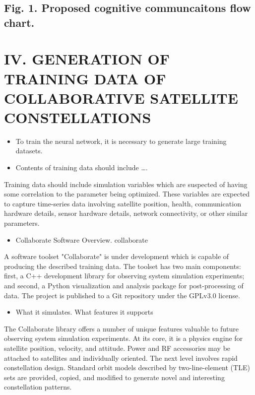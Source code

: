 \documentclass[11pt]{article}
\begin{document}
\subsection*{Fig. 1. Proposed cognitive communcaitons flow chart.}
\label{sec:orgf4b25f3}

\section*{IV. GENERATION OF TRAINING DATA OF COLLABORATIVE SATELLITE CONSTELLATIONS}
\label{sec:orge0317fa}

\begin{itemize}
\item To train the neural network, it is necessary to generate large training
datasets.

\item Contents of training data should include \ldots{}.
\end{itemize}

Training data should include simulation variables which are suspected of having
some correlation to the parameter being optimized.  These variables are expected
to capture time-series data involving satellite position, health, communication
hardware details, sensor hardware details, network connectivity, or other
similar parameters.

\begin{itemize}
\item Collaborate Software Overview.  collaborate
\end{itemize}
A software toolset "Collaborate" is under development which is capable of
producing the described training data.  The toolset has two main components:
first, a C++ development library for observing system simulation experiments;
and second, a Python visualization and analysis package for post-processing of
data.  The project is published to a Git repository under the GPLv3.0 license.

\begin{itemize}
\item What it simulates. What features it supports
\end{itemize}
The Collaborate library offers a number of unique features valuable to future
observing system simulation experiments.  At its core, it is a physics engine
for satellite position, velocity, and attitude.  Power and RF accessories may be
attached to satellites and individually oriented.  The next level involves rapid
constellation design.  Standard orbit models described by two-line-element (TLE)
sets are provided, copied, and modified to generate novel and interesting
constellation patterns.
\end{document}
